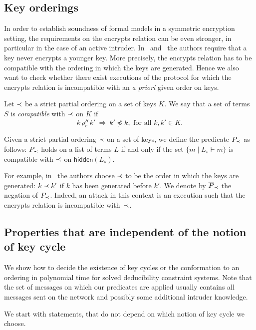 \documentclass[acmtocl,acmnow]{acmtrans2m}
\newcommand{\set}[1]{\lbrace{#1}\rbrace}
\newcommand{\HK}{K}
\newcommand{\lset}[1]{#1_s}
\newcommand{\hidden}[1]{\mathsf{hidden}({#1})}
\newcommand{\nko}{\preceq}
\newcommand{\dedsyss}[1]{deducibility constraint systems}
\begin{document}
\subsection{Key orderings}
In order to establish soundness of formal models in a symmetric
encryption setting, the requirements on the encrypts relation
can be even stronger, in particular in the case of an active
intruder. In~\cite{Backes_Pfitzmann_CSFW04_symmetric_encryption}
and~\cite{cryptoeprint:2005:020} the authors require that a key never
encrypts a younger key. More precisely, the encrypts relation has to
be compatible with the ordering in which the keys are generated. Hence we also want to check whether there
exist executions of the protocol for which the encrypts relation is incompatible with an \textit{a priori}
given order on keys.

\begin{definition}\label{def:korder}
Let $\prec$ be a strict partial ordering on a set of  keys $K$. We say that a set of terms $S$
is \emph{compatible} with $\prec$ on $K$ if
\[ k\,\rho_e^{S}\, k'\ \Rightarrow\ k'\not\nko k, \text{ for all }k,k'\in\HK.\]

Given a strict partial ordering $\prec$ on a set of keys, we define the predicate $P_{\prec}$ as follows:
$P_{\prec}$ holds on a list of terms $L$ if and only if
the set $\set{m\mid \lset{L}\vdash m}$ is compatible with $\prec$ on $\hidden{\lset{L}}$.
\end{definition}
For example,
in~\cite{Backes_Pfitzmann_CSFW04_symmetric_encryption,cryptoeprint:2005:020}
the authors choose $\prec$ to be the order in which the keys are
generated: $k\prec k'$ if $k$ has been generated before $k'$.
We denote by $\overline{P}_{\prec}$  the
negation of $P_{\prec}$. Indeed, an attack in this context is an execution such that the
encrypts relation is incompatible with~$\prec$. 




\subsection{Properties that are independent of the notion of key cycle}
We show how to decide the existence of key cycles or the conformation
to an ordering in polynomial time for solved \dedsyss{}.
Note that the set of messages on which our predicates are applied usually contains all messages sent on
the network and possibly some additional intruder knowledge.




We start with statements, that do not depend on which notion of key cycle
we choose.
\end{document}
